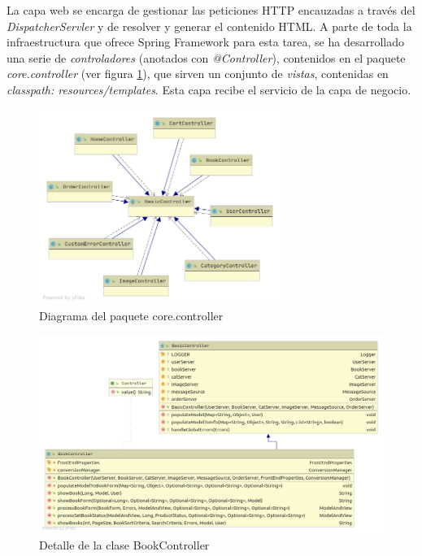 \documentclass[a4paper,12pt,twoside,openright]{report}
\begin{document}
    La capa web se encarga de gestionar las peticiones HTTP encauzadas a través del \emph{DispatcherServler} y de resolver y generar el contenido HTML. A parte de toda la infraestructura que ofrece Spring Framework para esta tarea, se ha desarrollado una serie de \emph{controladores} (anotados con \emph{@Controller}), contenidos en el paquete \emph{core.controller} (ver figura \ref{fig:package_controller}), que sirven un conjunto de \emph{vistas}, contenidas en \emph{classpath: resources/templates}. Esta capa recibe el servicio de la capa de negocio.
    	
   	\begin{figure}[htb!]
   		\centering
   		\includegraphics[width=0.7\textwidth,keepaspectratio]{package_controller}
   		\caption{Diagrama del paquete core.controller}
   		\label{fig:package_controller}
   	\end{figure}

   	\begin{figure}[htb!]
   		\centering
   		\includegraphics[width=\textwidth,keepaspectratio]{detail_bookController}
   		\caption{Detalle de la clase BookController}
   		\label{fig:detail_bookController}
   	\end{figure}
    	
\end{document}
